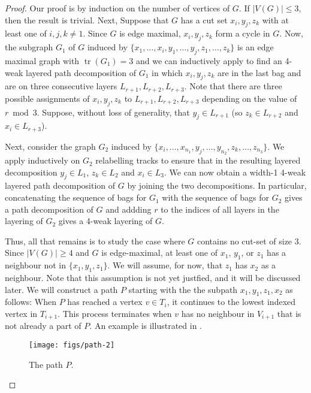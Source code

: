 \documentclass{patmorin}
\DeclareMathOperator{\tr}{tr}
\begin{document}
\begin{proof}
  Our proof is by induction on the number of vertices of $G$.
  If $|V(G)|\le 3$, then the result is trivial.
  Next, Suppose
  that $G$ has a cut set $x_i,y_j,z_k$ with at least one of $i,j,k\neq 1$.
  Since $G$ is edge maximal, $x_i,y_j,z_k$ form a cycle in $G$.  Now, the
  subgraph $G_1$ of $G$ induced by $\{x_1,\ldots,x_i, y_1,\ldots,y_j,
  z_1,\ldots,z_k\}$ is an edge maximal graph with $\tr(G_1)=3$ and
  we can inductively apply  to find an 4-weak layered
  path decomposition of $G_1$ in which $x_i,y_j,z_k$ are in the last
  bag and are on three consecutive layers $L_{r+1},L_{r+2},L_{r+3}$.
  Note that there are three possible assignments of $x_i,y_j,z_k$ to
  $L_{r+1},L_{r+2},L_{r+3}$ depending on the value of $r\bmod 3$.  Suppose, without loss of generality, that $y_j\in L_{r+1}$ (so $z_k\in L_{r+2}$ and $x_i\in L_{r+3}$).

  Next, consider the graph $G_2$ induced by
  $\{x_i,\ldots,x_{n_1},y_j,\ldots,y_{n_2},z_k,\ldots,z_{n_3}\}$.
  We apply  inductively on $G_2$ relabelling tracks
  to ensure that in the
  resulting layered decomposition $y_j\in L_1$, $z_k\in L_2$ and $x_i\in
  L_3$.   We can now obtain a width-1 4-weak layered path decomposition of
  $G$ by joining the two decompositions.  In particular,  concatenating
  the sequence of bags for $G_1$ with the sequence of bags for $G_2$
  gives a path decomposition of $G$ and addding $r$ to the indices of
  all layers in the layering of $G_2$ gives a 4-weak layering of $G$.

  Thus, all that remains is to study the case where $G$ contains no
  cut-set of size 3. Since $|V(G)|\ge 4$ and $G$ is edge-maximal, at least
  one of $x_1$, $y_1$, or $z_1$ has a neighbour not in $\{x_1,y_1,z_1\}$.
  We will assume, for now, that $z_1$ has $x_2$ as a neighbour.  Note
  that this assumption is not yet justfied, and it will be discussed later.
  We will construct a path $P$ starting with the the subpath
  $x_1,y_1,z_1,x_2$ as follows:  When $P$ has reached a vertex $v\in T_i$,
  it continues to the lowest indexed vertex in $T_{i+1}$. This process
  terminates when $v$ has no neighbour in $V_{i+1}$ that is not already
  a part of $P$.  An example is illustrated in .

  \begin{figure}
     \begin{center}
        \texttt{[image: figs/path-2]}
     \end{center}
     \caption{The path $P$.}
  \end{figure}


\end{proof}
\end{document}
